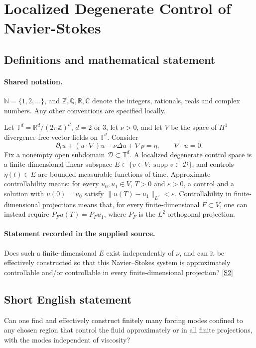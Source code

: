 \documentclass[11pt]{article}
\newcommand{\sref}[2]{\hyperlink{source:#1:#2}{[S#2]}}
\begin{document}
\section{Localized Degenerate Control of Navier-Stokes}\label{statement}

\subsection{Definitions and mathematical statement}

\paragraph{Shared notation.}$\mathbb N=\{1,2,\ldots\}$, and $\mathbb Z,\mathbb Q,\mathbb R,\mathbb C$ denote the integers, rationals, reals and complex numbers. Any other conventions are specified locally.


Let $\mathbb T^d=\mathbb R^d/(2\pi\mathbb Z)^d$, $d=2$ or $3$, let $\nu>0$, and let $V$ be the space of $H^1$ divergence-free vector fields on $\mathbb T^d$. Consider
\[\partial_tu+(u\cdot\nabla)u-\nu\Delta u+\nabla p=\eta,\qquad\nabla\cdot u=0.\]
Fix a nonempty open subdomain $\mathcal D\subset\mathbb T^d$. A localized degenerate control space is a finite-dimensional linear subspace $E\subset\{v\in V:\operatorname{supp}v\subset\overline{\mathcal D}\}$, and controls $\eta(t)\in E$ are bounded measurable functions of time. Approximate controllability means: for every $u_0,u_1\in V$, $T>0$ and $\varepsilon>0$, a control and a solution with $u(0)=u_0$ satisfy $\|u(T)-u_1\|_{L^2}<\varepsilon$. Controllability in finite-dimensional projections means that, for every finite-dimensional $F\subset V$, one can instead require $P_Fu(T)=P_Fu_1$, where $P_F$ is the $L^2$ orthogonal projection.
\paragraph{Statement recorded in the supplied source.}
Does such a finite-dimensional $E$ exist independently of $\nu$, and can it be effectively constructed so that this Navier--Stokes system is approximately controllable and/or controllable in every finite-dimensional projection? \sref{statement}{2}
\subsection{Short English statement}
Can one find and effectively construct finitely many forcing modes confined to any chosen region that control the fluid approximately or in all finite projections, with the modes independent of viscosity?
\end{document}
